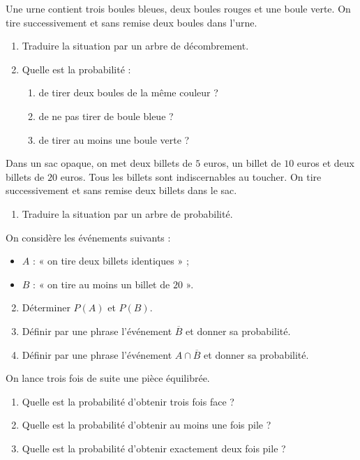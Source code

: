 \documentclass[11pt]{article}
\begin{document}
\begin{exo}
  Une urne contient trois boules bleues, deux boules rouges et une boule verte.
  On tire successivement et sans remise deux boules dans l'urne.
  \begin{enumerate}
    \item Traduire la situation par un arbre de décombrement.
    \item Quelle est la probabilité :
      \begin{enumerate}
        \item de tirer deux boules de la même couleur ?
        \item de ne pas tirer de boule bleue ?
        \item de tirer au moins une boule verte ?
      \end{enumerate}
  \end{enumerate}
\end{exo}

\begin{exo}
  Dans un sac opaque, on met deux billets de $5$ euros, un billet de $10$ euros
  et deux billets de $20$ euros. Tous les billets sont indiscernables au
  toucher. On tire successivement et sans remise deux billets dans le sac.
  \begin{enumerate}
    \item Traduire la situation par un arbre de probabilité.
  \end{enumerate}
  On considère les événements suivants :
  \begin{itemize}
    \item $A$ : « on tire deux billets identiques » ;
    \item $B$ : « on tire au moins un billet de $20$ ».
  \end{itemize}
  \begin{enumerate}
      \setcounter{enumi}{1}
    \item Déterminer $P(A)$ et $P(B)$.
    \item Définir par une phrase l'événement $\overline B$ et donner sa
      probabilité.
    \item Définir par une phrase l'événement $A\cap\overline B$ et donner sa
      probabilité.
  \end{enumerate}
\end{exo}

\begin{exo}
  On lance trois fois de suite une pièce équilibrée.
  \begin{enumerate}
    \item Quelle est la probabilité d'obtenir trois fois face ?
    \item Quelle est la probabilité d'obtenir au moins une fois pile ?
    \item Quelle est la probabilité d'obtenir exactement deux fois pile ?
  \end{enumerate}
\end{exo}
\end{document}
